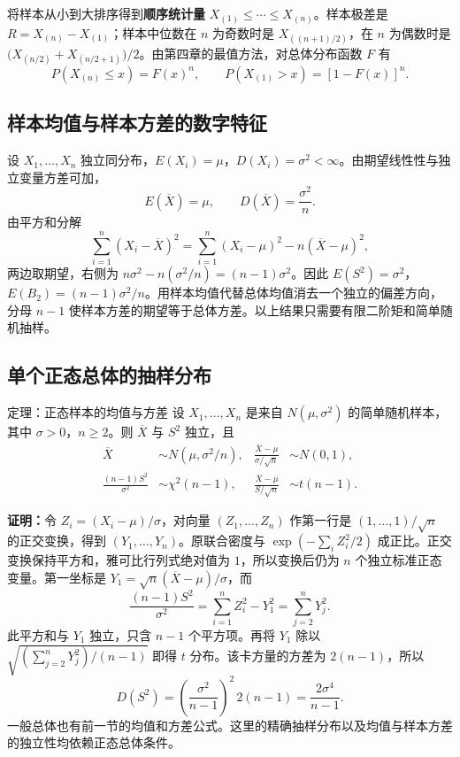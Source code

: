 \documentclass[UTF8,fontset=none,zihao=-4,a4paper]{ctexart}
\newcommand{\term}[1]{\textbf{#1}}
\newcommand{\proof}{\par\noindent\textbf{证明：}}
\begin{document}
将样本从小到大排序得到\term{顺序统计量} $X_{(1)}\le\cdots\le X_{(n)}$。样本极差是 $R=X_{(n)}-X_{(1)}$；样本中位数在 $n$ 为奇数时是 $X_{((n+1)/2)}$，在 $n$ 为偶数时是 $\bigl(X_{(n/2)}+X_{(n/2+1)}\bigr)/2$。由第四章的最值方法，对总体分布函数 $F$ 有
\[
P(X_{(n)}\le x)=F(x)^n,\qquad P(X_{(1)}>x)=[1-F(x)]^n.
\]

\subsection{样本均值与样本方差的数字特征}
设 $X_1,\ldots,X_n$ 独立同分布，$E(X_i)=\mu$，$D(X_i)=\sigma^2<\infty$。由期望线性性与独立变量方差可加，
\[
E(\overline X)=\mu,\qquad D(\overline X)=\frac{\sigma^2}{n}.
\]
由平方和分解
\[
\sum_{i=1}^n(X_i-\overline X)^2
=\sum_{i=1}^n(X_i-\mu)^2-n(\overline X-\mu)^2,
\]
两边取期望，右侧为 $n\sigma^2-n(\sigma^2/n)=(n-1)\sigma^2$。因此 $E(S^2)=\sigma^2$，$E(B_2)=(n-1)\sigma^2/n$。用样本均值代替总体均值消去一个独立的偏差方向，分母 $n-1$ 使样本方差的期望等于总体方差。以上结果只需要有限二阶矩和简单随机抽样。

\subsection{单个正态总体的抽样分布}
\begin{infobox}{定理：正态样本的均值与方差}
设 $X_1,\ldots,X_n$ 是来自 $N(\mu,\sigma^2)$ 的简单随机样本，其中 $\sigma>0$，$n\ge2$。则 $\overline X$ 与 $S^2$ 独立，且
\begin{align*}
\overline X&\sim N(\mu,\sigma^2/n),&
\frac{\overline X-\mu}{\sigma/\sqrt n}&\sim N(0,1),\\
\frac{(n-1)S^2}{\sigma^2}&\sim\chi^2(n-1),&
\frac{\overline X-\mu}{S/\sqrt n}&\sim t(n-1).
\end{align*}
\end{infobox}
\proof 令 $Z_i=(X_i-\mu)/\sigma$，对向量 $(Z_1,\ldots,Z_n)$ 作第一行是 $(1,\ldots,1)/\sqrt n$ 的正交变换，得到 $(Y_1,\ldots,Y_n)$。原联合密度与 $\exp(-\sum_i Z_i^2/2)$ 成正比。正交变换保持平方和，雅可比行列式绝对值为 $1$，所以变换后仍为 $n$ 个独立标准正态变量。第一坐标是 $Y_1=\sqrt n(\overline X-\mu)/\sigma$，而
\[
\frac{(n-1)S^2}{\sigma^2}=\sum_{i=1}^n Z_i^2-Y_1^2
=\sum_{j=2}^n Y_j^2.
\]
此平方和与 $Y_1$ 独立，只含 $n-1$ 个平方项。再将 $Y_1$ 除以 $\sqrt{(\sum_{j=2}^n Y_j^2)/(n-1)}$ 即得 $t$ 分布。该卡方量的方差为 $2(n-1)$，所以
\[
D(S^2)=\left(\frac{\sigma^2}{n-1}\right)^2\,2(n-1)=\frac{2\sigma^4}{n-1}.
\]
一般总体也有前一节的均值和方差公式。这里的精确抽样分布以及均值与样本方差的独立性均依赖正态总体条件。
\end{document}
